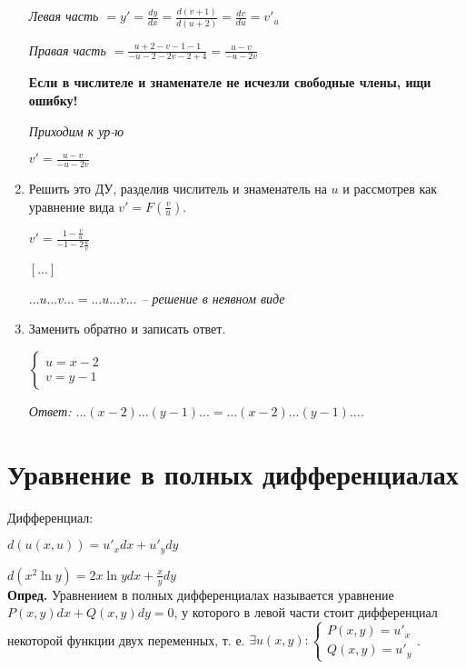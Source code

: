 \documentclass[10pt, a4paper]{article}
\begin{document}
\begin{enumerate}
        \par\textit{Левая часть $ = y' =  \frac{dy}{dx} = \frac{d(v + 1)}{d(u + 2)} = \frac{dv}{du} = v'_u$}
        \par\textit{Правая часть $ = \frac{u + 2 - v - 1 - 1}{-u - 2 - 2v - 2 + 4} = \frac{u - v}{-u - 2v}$}
        \par\textbf{Если в числителе и знаменателе не исчезли свободные члены, ищи ошибку!}
        \par\textit{Приходим к ур-ю}
        \par $v' = \frac{u - v}{-u - 2v}$
    \item Решить это ДУ, разделив числитель и знаменатель на $u$ и рассмотрев как уравнение вида $v' = F(\frac{v}{u})$.
        \par $v' = \frac{1 - \frac{v}{u}}{-1 - 2\frac{u}{v}}$
        \par $[...]$
        \par\textit{$...u...v... = ...u...v...$ -- решение в неявном виде}
    \item Заменить обратно и записать ответ.
        \par$\begin{cases}
            u = x - 2 \\
            v = y - 1
            \end{cases}$
        \par\textit{Ответ: $...(x - 2)...(y - 1)... = ...(x - 2)...(y - 1)...$.}
\end{enumerate}


\section{Уравнение в полных дифференциалах}
Дифференциал:
\par $d(u(x, u)) = u'_xdx + u'_ydy$
\par $d(x^2\ln{y}) = 2x\ln{y}dx + \frac{x}{y}dy$ \\
\textbf{Опред.} Уравнением в полных дифференциалах называется уравнение $P(x, y)dx + Q(x, y)dy = 0$,
у которого в левой части стоит дифференциал некоторой функции двух переменных, т. е. $\exists u(x, y):
\begin{cases}
    P(x, y) = u'_x \\
    Q(x, y) = u'_y
\end{cases}$.
\end{document}
